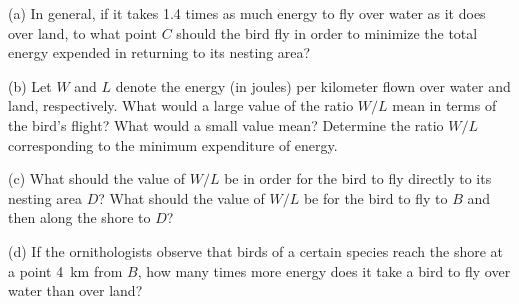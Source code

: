 \documentclass{sebase}
\begin{document}
\begin{multicols}{2}
\begin{ExerciseList}
\begin{ExerciseList}
\item[(a)] In general, if it takes 1.4 times as much energy to fly over
water as it does over land, to what point $C$ should the bird fly in order
to minimize the total energy expended in returning to its nesting area?

%

%

\item[(b)] Let $W$ and $L$ denote the energy (in joules) per kilometer flown
over water and land, respectively. What would a large value of the ratio $%
W/L $ mean in terms of the bird's flight? What would a small value mean?
Determine the ratio $W/L$ corresponding to the minimum expenditure of energy.

%

%

\item[(c)] What should the value of $W/L$ be in order for the bird to fly
directly to its nesting area $D$? What should the value of $W/L$ be for the
bird to fly to $B$ and then along the shore to $D$?

%

%

\item[(d)] If the ornithologists observe that birds of a certain species
reach the shore at a point 4~km from $B$, how many times more energy does it
take a bird to fly over water than over land?


\end{ExerciseList}
\end{ExerciseList}
\end{multicols}
\end{document}

